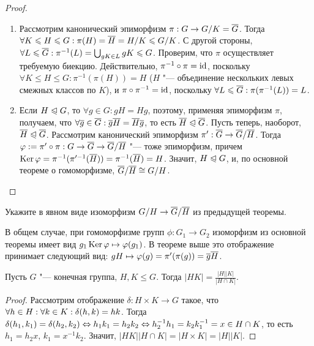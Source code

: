 \begin{proof}~
	\begin{enumerate}
		\item Рассмотрим канонический эпиморфизм $\pi: G \hm\to G / K = \ol{G}$. Тогда $\forall K \leqslant H \leqslant G: \pi(H) =\overline{H} = H / K \leqslant G / K$. С другой стороны, $\forall L \le \ol{G}: \pi^{-1}(L) = \bigcup_{gK \in L}gK \hm\le G$. Проверим, что $\pi$ осуществляет требуемую биекцию. Действительно, $\pi^{-1}\circ\pi \hm= \id$, поскольку $\forall K \le H \le G: \pi^{-1}(\pi(H)) = H$ ($H$ "--- объединение нескольких левых смежных классов по $K$), и $\pi\circ\pi^{-1} = \operatorname{id}$, поскольку $\forall L \leqslant \overline{G}: \pi(\pi^{-1}(L)) = L$.
		
		\item Если $H \trianglelefteqslant G$, то $\forall g \in G: gH = Hg$, поэтому, применяя эпиморфизм $\pi$, получаем, что $\forall \overline{g} \in \overline{G}: \overline{g}\overline{H} = \overline{H}\overline{g}$, то есть $\overline{H} \trianglelefteqslant \overline{G}$. Пусть теперь, наоборот, $\overline{H} \trianglelefteqslant \overline{G}$. Рассмотрим канонический эпиморфизм $\pi': \overline{G} \to \overline{G} / \overline{H}$. Тогда $\phi := \pi'\circ\pi: G \hm\to \ol{G} \hm\to \ol{G} / \ol{H}$ "--- тоже эпиморфизм, причем $\ke \phi = \pi^{-1}(\pi'^{-1}(\ol{H})) \hm= \pi^{-1}(\ol{H}) = H$. Значит, $H \trianglelefteqslant G$, и, по основной теореме о гомоморфизме, $\overline{G} / \overline{H} \cong G / H$.
	\end{enumerate}
\end{proof}

\begin{exercise}
	Укажите в явном виде изоморфизм $G / H \hm\to \ol{G} / \ol{H}$ из предыдущей теоремы.
\end{exercise}

\begin{solution}
	В общем случае, при гомоморфизме групп $\phi: G_1 \to G_2$ изоморфизм из основной теоремы имеет вид $g_1\operatorname{Ker}\varphi \mapsto \varphi(g_1)$. В теореме выше это отображение принимает следующий вид: $gH \hm\mapsto \phi(g) = \pi'(\pi(g)) = \ol{g}\ol{H}$.
\end{solution}

\begin{proposition}
	Пусть $G$ "--- конечная группа, $H, K \le G$. Тогда $|HK| = \frac{|H||K|}{|H\cap K|}$.
\end{proposition}

\begin{proof}
	Рассмотрим отображение $\delta: H\times K \to G$ такое, что $\forall h \hm\in H: \forall k \in K: \delta(h, k) = hk$. Тогда $\delta(h_1, k_1) = \delta(h_2, k_2) \hm\Leftrightarrow h_1k_1 = h_2k_2 \hm\Leftrightarrow h_2^{-1}h_1 = k_2k_1^{-1} = x \in H \cap K$, то есть $h_1 = h_2x$, $k_1 = x^{-1}k_2$. Значит, $|HK||H \cap K| = |H \times K| = |H||K|$.
\end{proof}

